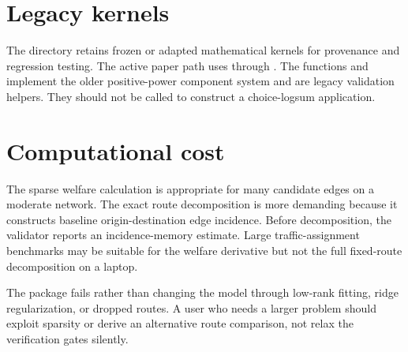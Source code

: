 \section{Legacy kernels}

The  directory retains frozen or adapted mathematical
kernels for provenance and regression testing. The active paper path uses
 through . The functions
 and  implement
the older positive-power component system and are legacy validation helpers.
They should not be called to construct a choice-logsum application.

\section{Computational cost}

The sparse welfare calculation is appropriate for many candidate edges on a
moderate network. The exact route decomposition is more demanding because it
constructs baseline origin-destination edge incidence. Before decomposition,
the validator reports an incidence-memory estimate. Large traffic-assignment
benchmarks may be suitable for the welfare derivative but not the full
fixed-route decomposition on a laptop.

The package fails rather than changing the model through low-rank fitting,
ridge regularization, or dropped routes. A user who needs a larger problem
should exploit sparsity or derive an alternative route comparison, not relax
the verification gates silently.
